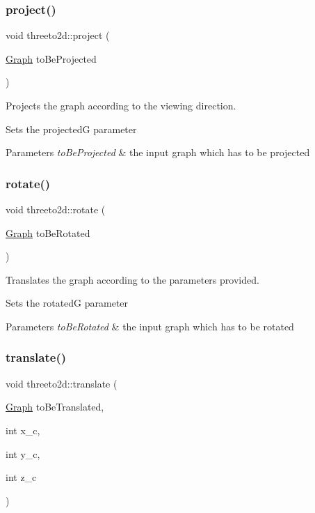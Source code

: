 \subsubsection{\texorpdfstring{project()}{project()}}
{\footnotesize\ttfamily void threeto2d\+::project (\begin{DoxyParamCaption}\item[{\mbox{\hyperlink{class_graph}{Graph}}}]{to\+Be\+Projected }\end{DoxyParamCaption})}



Projects the graph according to the viewing direction. 

Sets the projectedG parameter 
\begin{DoxyParams}{Parameters}
{\em to\+Be\+Projected} & the input graph which has to be projected \\
\hline
\end{DoxyParams}
\mbox{\label{classthreeto2d_a8e600dd9c439eb6d608138c73a5a42e8}} 
\subsubsection{\texorpdfstring{rotate()}{rotate()}}
{\footnotesize\ttfamily void threeto2d\+::rotate (\begin{DoxyParamCaption}\item[{\mbox{\hyperlink{class_graph}{Graph}}}]{to\+Be\+Rotated }\end{DoxyParamCaption})}



Translates the graph according to the parameters provided. 

Sets the rotatedG parameter 
\begin{DoxyParams}{Parameters}
{\em to\+Be\+Rotated} & the input graph which has to be rotated \\
\hline
\end{DoxyParams}
\mbox{\label{classthreeto2d_a18267c9cf2d7f7abd85da846cb7d4519}} 
\subsubsection{\texorpdfstring{translate()}{translate()}}
{\footnotesize\ttfamily void threeto2d\+::translate (\begin{DoxyParamCaption}\item[{\mbox{\hyperlink{class_graph}{Graph}}}]{to\+Be\+Translated,  }\item[{int}]{x\+\_\+c,  }\item[{int}]{y\+\_\+c,  }\item[{int}]{z\+\_\+c }\end{DoxyParamCaption})}



